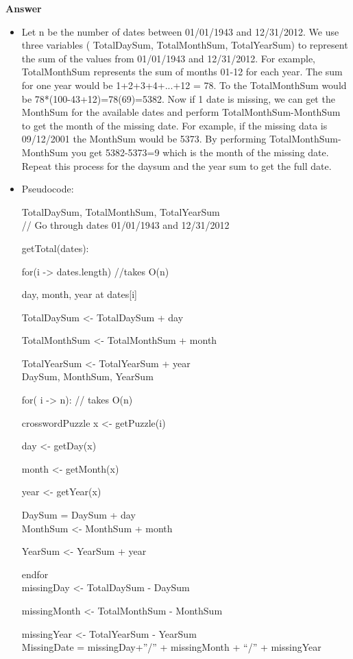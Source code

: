 \documentclass{article}
\begin{document}
\textbf{ Answer }
\begin{itemize}
\item Let n be the number of dates between 01/01/1943 and 12/31/2012. We use three variables ( TotalDaySum, TotalMonthSum, TotalYearSum) to represent the sum of the values from 01/01/1943 and 12/31/2012. For example, TotalMonthSum represents the sum of months 01-12 for each year. The sum for one year would be 1+2+3+4+...+12 =  78. To the TotalMonthSum would be 78*(100-43+12)=78(69)=5382. Now if 1 date is missing, we can get the MonthSum for the available dates and perform TotalMonthSum-MonthSum to get the month of the missing date. For example, if the missing data is 09/12/2001 the MonthSum would be 5373. By performing TotalMonthSum-MonthSum you get 5382-5373=9 which is the month of the missing date. Repeat this process for the daysum and the year sum to get the full date. 

\item Pseudocode:

TotalDaySum, TotalMonthSum, TotalYearSum\\

// Go through dates 01/01/1943 and 12/31/2012

getTotal(dates): 

\qquad for(i -> dates.length)  //takes O(n)

\qquad \qquad day, month, year at dates[i]

\qquad \qquad TotalDaySum <- TotalDaySum + day

\qquad \qquad TotalMonthSum <- TotalMonthSum + month

\qquad \qquad TotalYearSum <- TotalYearSum + year\\
	
DaySum, MonthSum, YearSum

for( i -> n): // takes O(n)

\qquad crosswordPuzzle x <- getPuzzle(i)

\qquad day <- getDay(x)

\qquad month <- getMonth(x)

\qquad year <- getYear(x)

\qquad DaySum = DaySum + day\\

\qquad MonthSum <- MonthSum + month

\qquad YearSum <- YearSum + year

endfor\\

missingDay <- TotalDaySum - DaySum

missingMonth <- TotalMonthSum - MonthSum

missingYear <- TotalYearSum - YearSum\\

MissingDate = missingDay+”/” + missingMonth + “/” + missingYear

\end{itemize}
\end{document}
